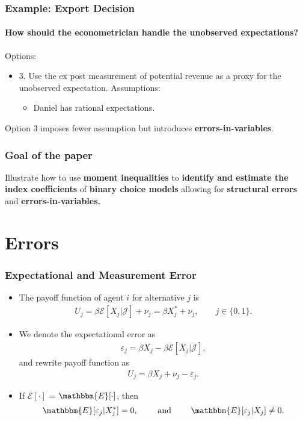 \documentclass[notes=show]{beamer}
\begin{document}
\begin{frame}
\frametitle{Example: Export Decision}
\framesubtitle{How should the econometrician handle the unobserved expectations?}

Options:
\begin{itemize}
	\item 3. Use the ex post measurement of potential revenue as a proxy for the unobserved expectation. Assumptions:
	\begin{itemize}
		\item Daniel has rational expectations.
	\end{itemize}
\end{itemize}
Option 3 imposes fewer assumption but introduces \textbf{errors-in-variables}.
\end{frame}
\begin{frame}
\frametitle{Goal of the paper}

Illustrate how to use \textbf{moment inequalities} to \textbf{identify and estimate the index coefficients}
of \textbf{binary choice models} allowing for \textbf{structural errors}
and \textbf{errors-in-variables.}

\end{frame}
\section{Errors}
\begin{frame}
\frametitle{Expectational and Measurement Error}

\begin{itemize}
	\item The payoff function of agent $i$ for alternative $j$ is
	\begin{align*}
	U_{j} = \beta\mathcal{E}[X_{j}|\mathcal{J}]+\nu_{j}= \beta X^{*}_{j}+\nu_{j},\qquad j \in \{0,1\}.
	\end{align*}
	\item We denote the expectational error as
	\begin{align*}
	\varepsilon_{j} = \beta X_{j}-\beta \mathcal{E}[X_{j}|\mathcal{J}],
	\end{align*}
	and rewrite payoff function as
	\begin{align*}
	U_{j} = \beta X_{j}+\nu_{j}-\varepsilon_{j}.
	\end{align*}
	\item If $\mathcal{E}[\cdot]$ = $\mathbbm{E}[\cdot]$, then
	\begin{equation*}
	\mathbbm{E}[\varepsilon_{j}|X^{*}_{j}]=0,\qquad\text{ and }\qquad\mathbbm{E}[\varepsilon_{j}|X_{j}]\neq0.
	\end{equation*}
\end{itemize}
\end{frame}
\end{document}
